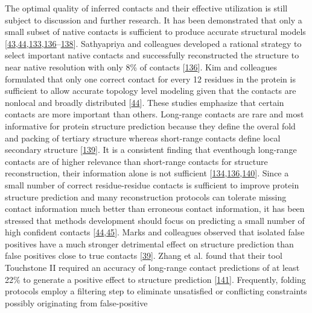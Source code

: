 \documentclass[11pt,a4paper,twoside]{book}
\theoremstyle{definition}
\theoremstyle{definition}
\theoremstyle{remark}
\begin{document}
The optimal quality of inferred contacts and their effective utilization
is still subject to discussion and further research. It has been
demonstrated that only a small subset of native contacts is sufficient
to produce accurate structural models
{[}\protect\hyperlink{ref-Vendruscolo1997}{43},\protect\hyperlink{ref-Kim2014}{44},\protect\hyperlink{ref-Konopka2014}{133},\protect\hyperlink{ref-Sathyapriya2009}{136}--\protect\hyperlink{ref-Vassura2007}{138}{]}.
Sathyapriya and colleagues developed a rational strategy to select
important native contacts and successfully reconstructed the structure
to near native resolution with only 8\% of contacts
{[}\protect\hyperlink{ref-Sathyapriya2009}{136}{]}. Kim and colleagues
formulated that only one correct contact for every 12 residues in the
protein is sufficient to allow accurate topology level modeling given
that the contacts are nonlocal and broadly distributed
{[}\protect\hyperlink{ref-Kim2014}{44}{]}. These studies emphasize that
certain contacts are more important than others. Long-range contacts are
rare and most informative for protein structure prediction because they
define the overal fold and packing of tertiary structure whereas
short-range contacts define local secondary structure
{[}\protect\hyperlink{ref-Adhikari2017}{139}{]}. It is a consistent
finding that eventhough long-range contacts are of higher relevance than
short-range contacts for structure reconstruction, their information
alone is not sufficient
{[}\protect\hyperlink{ref-Kosciolek2014}{134},\protect\hyperlink{ref-Sathyapriya2009}{136},\protect\hyperlink{ref-DiLena2009a}{140}{]}.
Since a small number of correct residue-residue contacts is sufficient
to improve protein structure prediction and many reconstruction
protocols can tolerate missing contact information much better than
erroneous contact information, it has been stressed that methods
development should focus on predicting a small number of high confident
contacts
{[}\protect\hyperlink{ref-Kim2014}{44},\protect\hyperlink{ref-Duarte2010}{45}{]}.
Marks and colleagues observed that isolated false positives have a much
stronger detrimental effect on structure prediction than false positives
close to true contacts {[}\protect\hyperlink{ref-Marks2011}{39}{]}.
Zhang et al. found that their tool Touchstone II required an accuracy of
long-range contact predictions of at least 22\% to generate a positive
effect to structure prediction
{[}\protect\hyperlink{ref-Zhang2003}{141}{]}. Frequently, folding
protocols employ a filtering step to eliminate unsatisfied or
conflicting constraints possibly originating from false-positive
\end{document}
